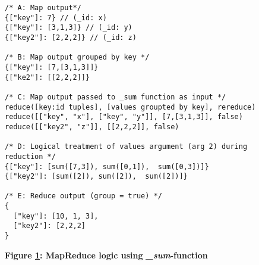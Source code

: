 \begin{figure}[H]
    \centering
    \begin{mdframed}[rightline=true,leftline=true]
        \begin{verbatim}
/* A: Map output*/
{["key"]: 7} // (_id: x)
{["key"]: [3,1,3]} // (_id: y)
{["key2"]: [2,2,2]} // (_id: z)

/* B: Map output grouped by key */
{["key"]: [7,[3,1,3]]}
{["ke2"]: [[2,2,2]]}

/* C: Map output passed to _sum function as input */
reduce([key:id tuples], [values groupted by key], rereduce)
reduce([["key", "x"], ["key", "y"]], [7,[3,1,3]], false)
reduce([["key2", "z"]], [[2,2,2]], false)

/* D: Logical treatment of values argument (arg 2) during reduction */
{["key"]: [sum([7,3]), sum([0,1]),  sum([0,3])]}
{["key2"]: [sum([2]), sum([2]),  sum([2])]}

/* E: Reduce output (group = true) */
{
  ["key"]: [10, 1, 3],
  ["key2"]: [2,2,2]
}
    \end{verbatim}
    \end{mdframed}
    \caption[MapReduce logic using \textit{\_sum}-function]{\textbf{Figure \ref{fig-sum-reduce-fn}: MapReduce logic using \textit{\_sum}-function}}
    \label{fig-sum-reduce-fn}
\end{figure}